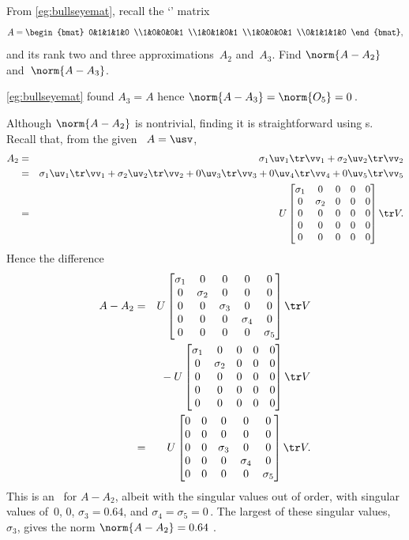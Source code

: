 \begin{reduce}
\begin{example} 
From \cref{eg:bullseyemat}, recall the `' matrix
\begin{equation*}
A=\begin{bmat} 0&1&1&1&0
\\1&0&0&0&1
\\1&0&1&0&1
\\1&0&0&0&1
\\0&1&1&1&0 \end{bmat},
\end{equation*}
and its rank two and three approximations~\(A_2\) and~\(A_3\).
Find \(\norm{A-A_2}\) and~\(\norm{A-A_3}\).
\begin{solution} 
\cref{eg:bullseyemat} found \(A_3=A\) hence \(\norm{A-A_3}=\norm{O_5}=0\)\,.

Although \(\norm{A-A_2}\) is nontrivial, finding it is straightforward using \svd{}s.
Recall that, from the given \svd\ \(A=\usv\),
\begin{eqnarray*}
A_2&=&\sigma_1\uv_1\tr\vv_1+\sigma_2\uv_2\tr\vv_2
\\&=&\sigma_1\uv_1\tr\vv_1+\sigma_2\uv_2\tr\vv_2+0\uv_3\tr\vv_3+0\uv_4\tr\vv_4+0\uv_5\tr\vv_5
\\&=&U\begin{bmatrix} \sigma_1&0&0&0&0
\\0&\sigma_2&0&0&0
\\0&0&0&0&0
\\0&0&0&0&0
\\0&0&0&0&0 \end{bmatrix}\tr V.
\end{eqnarray*}
Hence the difference
\begin{eqnarray*}
A-A_2&=&U\begin{bmatrix} \sigma_1&0&0&0&0
\\0&\sigma_2&0&0&0
\\0&0&\sigma_3&0&0
\\0&0&0&\sigma_4&0
\\0&0&0&0&\sigma_5 \end{bmatrix}\tr V
\\&&{}
-U\begin{bmatrix} \sigma_1&0&0&0&0
\\0&\sigma_2&0&0&0
\\0&0&0&0&0
\\0&0&0&0&0
\\0&0&0&0&0 \end{bmatrix}\tr V
\\&=&U\begin{bmatrix} 0&0&0&0&0
\\0&0&0&0&0
\\0&0&\sigma_3&0&0
\\0&0&0&\sigma_4&0
\\0&0&0&0&\sigma_5 \end{bmatrix}\tr V.
\end{eqnarray*}
This is an \svd\ for \(A-A_2\), albeit with the singular values out of order, with singular values of~\(0\), \(0\), \(\sigma_3=0.64\), and \(\sigma_4=\sigma_5=0\)\,.
The largest of these singular values,~\(\sigma_3\), gives the norm \(\norm{A-A_2}=0.64\) \twodp.


\end{solution}
\end{example}
\end{reduce}
